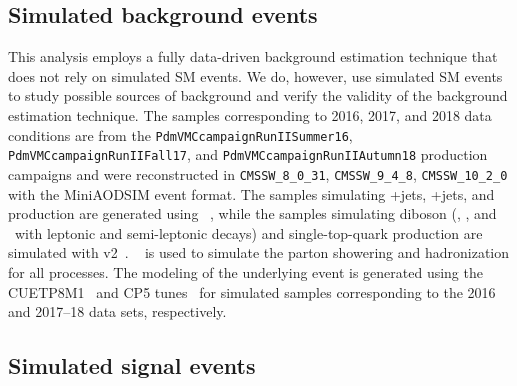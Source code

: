\subsection{Simulated background events}
\label{bg_samples}
This analysis employs a fully data-driven background estimation technique that does not rely on simulated SM events. We do, however, use simulated SM events to study possible sources of background and verify the validity of the background estimation technique. The samples corresponding to 2016, 2017, and 2018 data conditions are from the \texttt{PdmVMCcampaignRunIISummer16}, \texttt{PdmVMCcampaignRunIIFall17}, and \texttt{PdmVMCcampaignRunIIAutumn18} production campaigns and were reconstructed in \texttt{CMSSW\_8\_0\_31}, \texttt{CMSSW\_9\_4\_8}, \texttt{CMSSW\_10\_2\_0} with the MiniAODSIM event format. The samples simulating \cPZ+jets, \PW+jets, and \ttbar production are generated using \MGvATNLO~\cite{madgraph, fxfx, mlm}, while the samples simulating diboson (\PW\PW, \PW\cPZ, and \cPZ\cPZ\ with leptonic and semi-leptonic decays) and single-top-quark production are simulated with \POWHEG v2~\cite{Frixione:2002ik,Nason:2004rx,Frixione:2007vw,Alioli:2008gx,Alioli:2010xd}. ~\cite{PYTHIA8} is used to simulate the parton showering and hadronization for all processes. The modeling of the underlying event is generated using the CUETP8M1~\cite{Khachatryan:2015pea} and CP5 tunes~\cite{Sirunyan:2019dfx} for simulated samples corresponding to the 2016 and 2017--18 data sets, respectively.

\subsection{Simulated signal events}

